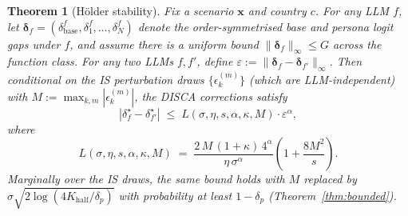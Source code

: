 \documentclass{article}
\newtheorem{theorem}{Theorem}
\begin{document}
\begin{theorem}[H\"older stability]
\label{thm:stability}
Fix a scenario $\mathbf{x}$ and country $c$. For any LLM $f$, let $\boldsymbol{\delta}_f = (\delta_{\text{base}}^f, \delta_1^f, \ldots, \delta_N^f)$ denote the order-symmetrised base and persona logit gaps under $f$, and assume there is a uniform bound $\|\boldsymbol{\delta}_f\|_\infty \leq G$ across the function class. For any two LLMs $f, f'$, define $\varepsilon := \|\boldsymbol{\delta}_f - \boldsymbol{\delta}_{f'}\|_\infty$. Then conditional on the IS perturbation draws $\{\epsilon_k^{(m)}\}$ (which are LLM-independent) with $M := \max_{k,m} |\epsilon_k^{(m)}|$, the DISCA corrections satisfy
\begin{equation}
|\delta^\star_f - \delta^\star_{f'}| \;\leq\; L(\sigma, \eta, s, \alpha, \kappa, M) \cdot \varepsilon^\alpha,
\label{eq:stability-bound}
\end{equation}
where
\begin{equation}
L(\sigma, \eta, s, \alpha, \kappa, M) 
\;=\; \frac{2\,M\,(1+\kappa)\,4^\alpha}{\eta\,\sigma^\alpha} \!\left(1 + \frac{8M^2}{s}\right).
\label{eq:stability-constant}
\end{equation}
Marginally over the IS draws, the same bound holds with $M$ replaced by $\sigma\sqrt{2\log(4K_{\text{half}}/\delta_p)}$ with probability at least $1 - \delta_p$ (Theorem~\ref{thm:bounded}).
\end{theorem}
\end{document}

